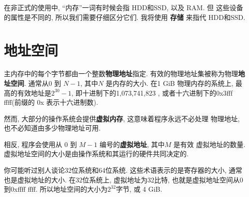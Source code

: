 \documentclass[12pt]{book}
\begin{document}
{在非正式的使用中, ``内存''一词有时候会指 HDD和SSD, 以及 RAM. 但
这些设备的属性是不同的, 所以我们需要仔细区分它们. 我将使用
{\bf 存储} 来指代 HDD和SSD.

\section{地址空间}
%

主内存中的每个字节都由一个整数{\bf 物理地址}指定.
有效的物理地址集被称为物理{\bf 地址空间}.
通常从0 到 $N-1$, 其中$N$ 是内存的大小.
在1 GiB 物理内存的系统上, 最高的有效地址是$2^{30}-1$, 
即十进制下的1,073,741,823 , 或者十六进制下的0x3fff ffff(前缀的 0x 表示十六进制数).

然而, 大部分的操作系统会提供{\bf 虚拟内存}, 这意味着程序永远不必处理
物理地址, 也不必知道由多少物理地址可用.

%

相反, 程序会使用从 0 到 $M-1$ 编号的{\bf 虚拟地址}, 其中$M$ 是有效
虚拟地址的数量. 虚拟地址空间的大小是由操作系统和其运行的硬件共同决定的.

你可能听过别人谈论32位系统和64位系统.
这些术语表示的是寄存器的大小, 通常也是虚拟地址的大小.
在32位系统上, 虚拟地址为32比特, 也就是虚拟地址空间从0到0xffff ffff.
所以地址空间的大小为$2^{32}$字节, 或 4 GiB.

}
\end{document}
